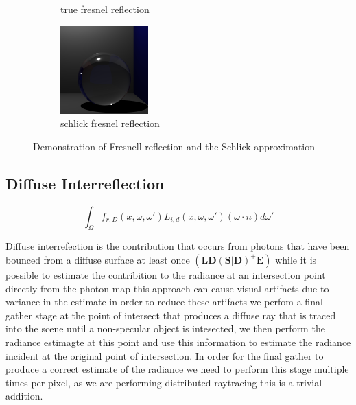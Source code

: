 \begin{figure}[h]
\begin{subfigure}[b]{0.3\textwidth}
	\caption{true fresnel reflection}
\end{subfigure}
\begin{subfigure}[b]{0.3\textwidth}
	\includegraphics[width=\textwidth]{./images/renders/refraction/render-schlick.png}
	\caption{schlick fresnel reflection}
\end{subfigure}
\caption{Demonstration of Fresnell reflection and the Schlick approximation}
\label{fig:shlick-compare}
\end{figure}

\subsection{Diffuse Interreflection}
\begin{equation*}
		\int_{\Omega}
			f_{r,D}(x, \omega, \omega')
			L_{i,d}(x,\omega,\omega')
			(\omega \cdot n)d\omega'
\end{equation*}

Diffuse interrefection is the contribution that occurs from photons that have been bounced from a diffuse surface at least once
$(\mathbf{LD(S|D)^+E})$ while it is possible to estimate the contribition to the radiance at an intersection point directly from the photon map this
approach can cause visual artifacts due to variance in the estimate in order to reduce these artifacts we perfom a final gather
stage at the point of intersect that produces a diffuse ray that is traced into the scene until a non-specular object is intesected,
we then perform the radiance estimagte at this point and use this information to estimate the radiance incident at the original point of
intersection.  In order for the final gather to produce a correct estimate of the radiance we need to perform this stage multiple times per pixel,
as we are performing distributed raytracing this is a trivial addition.

